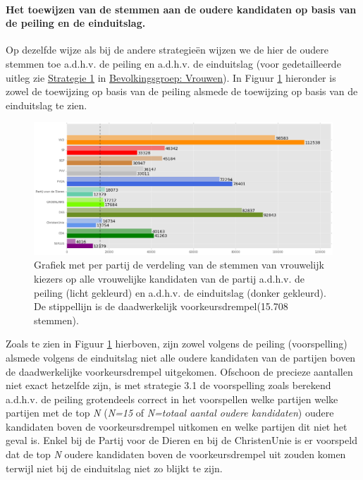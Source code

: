 \paragraph{Het toewijzen van de stemmen aan de oudere kandidaten op basis van de peiling en de einduitslag.}
Op dezelfde wijze als bij de andere strategie\"{e}n wijzen we de hier de oudere stemmen toe a.d.h.v. de peiling en a.d.h.v. de einduitslag (voor gedetailleerde uitleg zie \hyperref[S1V]{Strategie 1} in \hyperref[vrouwen]{Bevolkingsgroep: Vrouwen}). In Figuur \ref{fig:stemmenS31O} hieronder is zowel de toewijzing op basis van de peiling alsmede de toewijzing op basis van de einduitslag te zien.

\begin{figure}[H]

	\includegraphics[width=\linewidth]	{stemmen_op_ouderen_top15_of_topN_samen.png}

			\caption{Grafiek met per partij de verdeling van de stemmen van vrouwelijk kiezers op alle vrouwelijke kandidaten van de partij a.d.h.v. de peiling (licht gekleurd) en a.d.h.v. de einduitslag (donker gekleurd). De stippellijn is de daadwerkelijk voorkeursdrempel(15.708 stemmen).}

\label{fig:stemmenS31O}
\end{figure}

Zoals te zien in Figuur \ref{fig:stemmenS31O} hierboven, zijn zowel volgens de peiling (voorspelling) alsmede volgens de einduitslag niet alle oudere kandidaten van de partijen boven de daadwerkelijke voorkeursdrempel uitgekomen. Ofschoon de precieze aantallen niet exact hetzelfde zijn, is met strategie 3.1 de voorspelling zoals berekend a.d.h.v. de peiling grotendeels correct in het voorspellen welke partijen welke partijen met de top \textit{N} (\textit{N=15} of \textit{N=totaal aantal oudere kandidaten}) oudere kandidaten boven de voorkeursdrempel uitkomen en welke partijen dit niet het geval is. Enkel bij de Partij voor de Dieren en bij de ChristenUnie is er voorspeld dat de top \textit{N} oudere kandidaten boven de voorkeursdrempel uit zouden komen terwijl niet bij de einduitslag niet zo blijkt te zijn.


